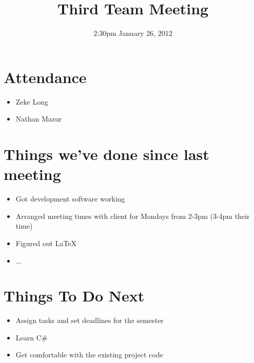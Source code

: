 \documentclass{article}
\begin{document}
\title{Third Team Meeting}
\date{2:30pm January 26, 2012}
\maketitle

\section{Attendance}
\begin{itemize}
\item Zeke Long
\item Nathan Mazur
\end{itemize}

\section{Things we've done since last meeting}
\begin{itemize}
\item Got development software working
\item Arranged meeting times with client for Mondays from 2-3pm (3-4pm their time)
\item Figured out LaTeX
\item ...
\end{itemize}

\section{Things To Do Next}
\begin{itemize}
\item Assign tasks and set deadlines for the semester
\item Learn C\#
\item Get comfortable with the existing project code
\end{itemize}
\end{document}
